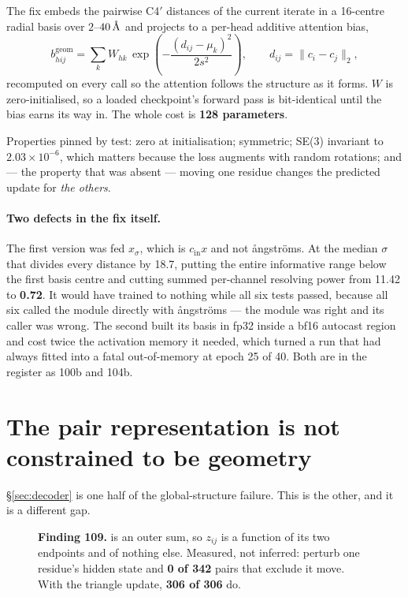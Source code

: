 \documentclass[11pt,a4paper]{article}
\begin{document}
The fix embeds the pairwise C4$'$ distances of the current iterate in a
16-centre radial basis over $2$--$40\,\text{\AA}$ and projects to a per-head
additive attention bias,
\begin{equation}
b^{\text{geom}}_{hij} = \sum_{k} W_{hk}\,
  \exp\!\left(-\frac{(d_{ij}-\mu_k)^2}{2s^2}\right),
\qquad d_{ij} = \lVert c_i - c_j \rVert_2 ,
\end{equation}
recomputed on every call so the attention follows the structure as it
forms. $W$ is zero-initialised, so a loaded checkpoint's forward pass is
bit-identical until the bias earns its way in. The whole cost is
\textbf{128 parameters}.

Properties pinned by test: zero at initialisation; symmetric; SE(3)
invariant to $2.03\times10^{-6}$, which matters because the loss augments
with random rotations; and --- the property that was absent --- moving
one residue changes the predicted update for \emph{the others}.

\paragraph{Two defects in the fix itself.} The first version was fed
$x_\sigma$, which is $c_{\text{in}}x$ and not \aa ngstr\"oms. At the
median $\sigma$ that divides every distance by 18.7, putting the entire
informative range below the first basis centre and cutting summed
per-channel resolving power from 11.42 to \textbf{0.72}. It would have
trained to nothing while all six tests passed, because all six called the
module directly with \aa ngstr\"oms --- the module was right and its
caller was wrong. The second built its basis in fp32 inside a bf16
autocast region and cost twice the activation memory it needed, which
turned a run that had always fitted into a fatal out-of-memory at
epoch 25 of 40. Both are in the register as 100b and 104b.

\section{The pair representation is not constrained to be geometry}
\label{sec:triangle}

\S\ref{sec:decoder} is one half of the global-structure failure. This is
the other, and it is a different gap.

\begin{figure}[H]\centering
\resizebox{\textwidth}{!}{}
\caption{\textbf{Finding 109.}  is an outer
sum, so $z_{ij}$ is a function of its two endpoints and of nothing else.
Measured, not inferred: perturb one residue's hidden state and
\textbf{0 of 342} pairs that exclude it move. With the triangle update,
\textbf{306 of 306} do.}
\label{fig:triangle}
\end{figure}
\end{document}
